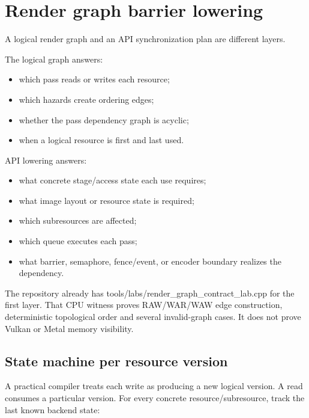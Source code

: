 \hypertarget{appendix-0fc95374cb7e}{}\label{referencestart:appendix-0fc95374cb7e}
\section{Render graph barrier lowering}\label{appendix-0fc95374cb7e-render-graph-barrier-lowering}

A logical render graph and an API synchronization plan are different layers.

The logical graph answers:

\begin{itemize}
\tightlist
\item
  which pass reads or writes each resource;
\item
  which hazards create ordering edges;
\item
  whether the pass dependency graph is acyclic;
\item
  when a logical resource is first and last used.
\end{itemize}

API lowering answers:

\begin{itemize}
\tightlist
\item
  what concrete stage/access state each use requires;
\item
  what image layout or resource state is required;
\item
  which subresources are affected;
\item
  which queue executes each pass;
\item
  what barrier, semaphore, fence/event, or encoder boundary realizes the dependency.
\end{itemize}

The repository already has tools/labs/render\_graph\_contract\_lab.cpp for the first layer. That CPU witness proves RAW/WAR/WAW edge construction, deterministic topological order and several invalid-graph cases. It does not prove Vulkan or Metal memory visibility.

\subsection{State machine per resource version}\label{appendix-0fc95374cb7e-state-machine-per-resource-version}

A practical compiler treats each write as producing a new logical version. A read consumes a particular version. For every concrete resource/subresource, track the last known backend state:

